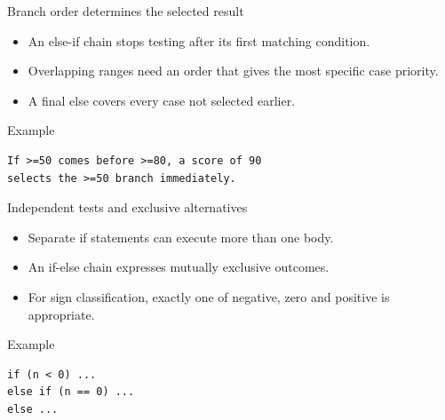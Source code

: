 \documentclass[10pt,aspectratio=169]{beamer}
\begin{document}
\begin{frame}[fragile,t]{Branch order determines the selected result}
\begin{itemize}
\item An else-if chain stops testing after its first matching condition.
\item Overlapping ranges need an order that gives the most specific case priority.
\item A final else covers every case not selected earlier.
\end{itemize}
\vspace{1mm}\begin{block}{Example}
\begin{lstlisting}
If >=50 comes before >=80, a score of 90
selects the >=50 branch immediately.
\end{lstlisting}
\end{block}
\end{frame}

\begin{frame}[fragile,t]{Independent tests and exclusive alternatives}
\begin{itemize}
\item Separate if statements can execute more than one body.
\item An if-else chain expresses mutually exclusive outcomes.
\item For sign classification, exactly one of negative, zero and positive is appropriate.
\end{itemize}
\vspace{1mm}\begin{block}{Example}
\begin{lstlisting}
if (n < 0) ...
else if (n == 0) ...
else ...
\end{lstlisting}
\end{block}
\end{frame}
\end{document}

